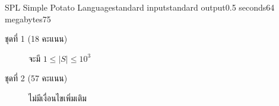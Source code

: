 \documentclass[11pt,a4paper]{article}
\begin{document}
\begin{problem}{SPL Simple Potato Language}{standard input}{standard output}{0.5 seconds}{64 megabytes}{75}
\begin{description}
\item[ชุดที่ 1 (18 คะแนน)] จะมี $1\leq |S|\leq 10^3$
\item[ชุดที่ 2 (57 คะแนน)] ไม่มีเงื่อนไขเพิ่มเติม 

\end{description}

\Examples

\begin{example}
%
\end{example}

\end{problem}
\end{document}
